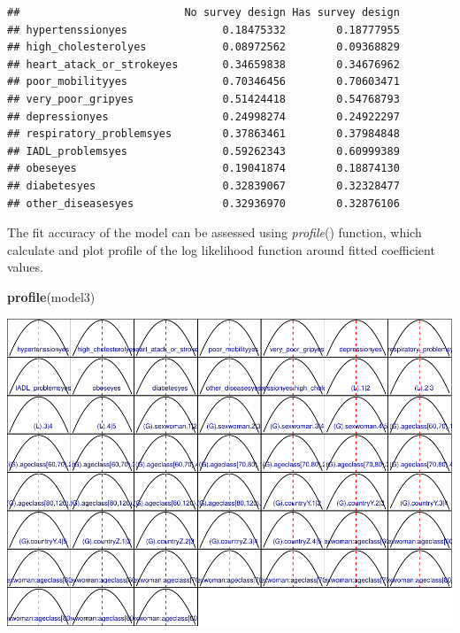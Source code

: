 \documentclass[]{article}
\newenvironment{Shaded}{\begin{snugshade}}{\end{snugshade}}
\newcommand{\DataTypeTok}[1]{\textcolor[rgb]{0.13,0.29,0.53}{#1}}
\newcommand{\KeywordTok}[1]{\textcolor[rgb]{0.13,0.29,0.53}{\textbf{#1}}}
\newcommand{\NormalTok}[1]{#1}
\newcommand{\OperatorTok}[1]{\textcolor[rgb]{0.81,0.36,0.00}{\textbf{#1}}}
\newcommand{\OtherTok}[1]{\textcolor[rgb]{0.56,0.35,0.01}{#1}}
\newcommand{\StringTok}[1]{\textcolor[rgb]{0.31,0.60,0.02}{#1}}
\begin{document}
\begin{Shaded}
\end{Shaded}

\begin{verbatim}
##                          No survey design Has survey design
## hypertenssionyes               0.18475332        0.18777955
## high_cholesterolyes            0.08972562        0.09368829
## heart_atack_or_strokeyes       0.34659838        0.34676962
## poor_mobilityyes               0.70346456        0.70603471
## very_poor_gripyes              0.51424418        0.54768793
## depressionyes                  0.24998274        0.24922297
## respiratory_problemsyes        0.37863461        0.37984848
## IADL_problemsyes               0.59262343        0.60999389
## obeseyes                       0.19041874        0.18874130
## diabetesyes                    0.32839067        0.32328477
## other_diseasesyes              0.32936970        0.32876106
\end{verbatim}

The fit accuracy of the model can be assessed using \emph{profile}()
function, which calculate and plot profile of the log likelihood
function around fitted coefficient values.

\begin{Shaded}
\begin{Highlighting}[]
\KeywordTok{profile}\NormalTok{(model3)}
\end{Highlighting}
\end{Shaded}

\includegraphics{vignette_files/figure-latex/unnamed-chunk-13-1.pdf}
\end{document}
